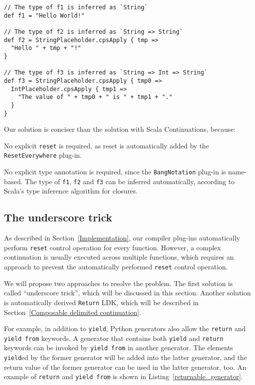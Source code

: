 \begin{lstlisting}[caption={The translated source code of \lstinline{Dsl.scala}-base solution of \lstinline{printf} problem},label={transformed-printf}]
// The type of f1 is inferred as `String`
def f1 = "Hello World!"

// The type of f2 is inferred as `String => String`
def f2 = StringPlaceholder.cpsApply { tmp =>
  "Hello " + tmp + "!"
}

// The type of f3 is inferred as `String => Int => String`
def f3 = StringPlaceholder.cpsApply { tmp0 =>
  IntPlaceholder.cpsApply { tmp1 =>
    "The value of " + tmp0 + " is " + tmp1 + "."
  }
}
\end{lstlisting}

Our solution is conciser than the solution with Scala Continuations, because:
\begin{enumerate*}
  \item No explicit \lstinline{reset} is required, as reset is automatically added by the \lstinline{ResetEverywhere} plug-in.
  \item No explicit type annotation is required, since the \lstinline{BangNotation} plug-in is name-based. The type of \lstinline{f1}, \lstinline{f2} and \lstinline{f3} can be inferred automatically, according to Scala's type inference algorithm for closures.
\end{enumerate*}

\subsection{The underscore trick}\label{The underscore trick}

As described in Section~\ref{Implementation}, our compiler plug-ins automatically perform \lstinline{reset} control operation for every function. However, a complex continuation is usually executed across multiple functions, which requires an approach to prevent the automatically performed \lstinline{reset} control operation.

We will propose two approaches to resolve the problem. The first solution is called ``underscore trick'', which will be discussed in this section. Another solution is automatically derived \lstinline{Return} LDK, which will be described in Section~\ref{Composable delimited continuation}.

For example, in addition to \lstinline{yield}, Python generators also allow the \lstinline{return} and \lstinline{yield from} keywords. A generator that contains both \lstinline{yield} and \lstinline{return} keywords can be invoked by \lstinline{yield from} in another generator. The elements \lstinline{yield}ed by the former generator will be added into the latter generator, and the return value of the former generator can be used in the latter generator, too. An example of \lstinline{return} and \lstinline{yield from} is shown in Listing~\ref{returnable_generator}.

